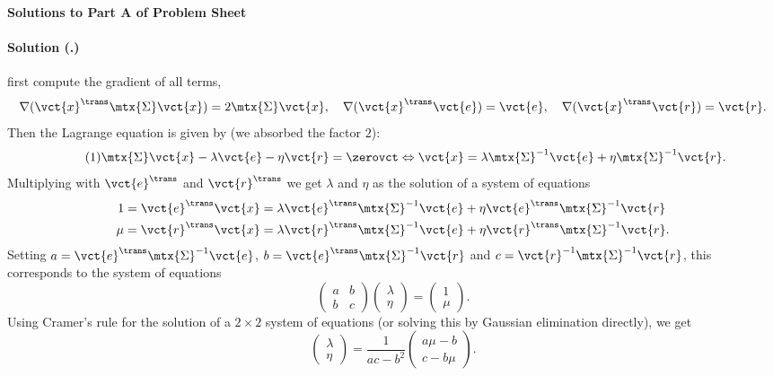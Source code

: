 \documentclass{article}
\newcounter{problemSheetNumber}
\newcounter{problems}
\renewcommand{\solution}[1]{\paragraph{Solution (\theproblemSheetNumber.\theproblems)}\addtocounter{problems}{1}\label{#1}}
\begin{document}
 
\begin{center}
{\Large {\bf Solutions to Part A of Problem Sheet \theproblemSheetNumber}}
\end{center}

\solution{pr:1} 
first compute the gradient of all terms,
\begin{equation*}
 \nabla (\vct{x}^{\trans}\mtx{\Sigma} \vct{x}) = 2\mtx{\Sigma} \vct{x}, \quad \nabla (\vct{x}^{\trans}\vct{e}) = \vct{e}, \quad \nabla (\vct{x}^{\trans}\vct{r})=\vct{r}.
\end{equation*}
Then the Lagrange equation is given by (we absorbed the factor $2$):
\begin{equation}\label{eq:1}\tag{1}
 \mtx{\Sigma} \vct{x}-\lambda \vct{e}-\eta \vct{r} = \zerovct \Leftrightarrow \vct{x} = \lambda \mtx{\Sigma}^{-1}\vct{e}+\eta\mtx{\Sigma}^{-1}\vct{r}.
\end{equation}
Multiplying with $\vct{e}^{\trans}$ and $\vct{r}^{\trans}$ we get $\lambda$ and $\eta$ as the solution of a system of equations
\begin{align*}
 1 = \vct{e}^{\trans}\vct{x} &= \lambda \vct{e}^{\trans}\mtx{\Sigma}^{-1}\vct{e}+ \eta \vct{e}^{\trans}\mtx{\Sigma}^{-1}\vct{r}\\
 \mu = \vct{r}^{\trans}\vct{x} &= \lambda \vct{r}^{\trans}\mtx{\Sigma}^{-1}\vct{e}+ \eta \vct{r}^{\trans}\mtx{\Sigma}^{-1}\vct{r}.
\end{align*}
Setting $a=\vct{e}^{\trans}\mtx{\Sigma}^{-1}\vct{e}$, $b=\vct{e}^{\trans}\mtx{\Sigma}^{-1}\vct{r}$ and $c=\vct{r}^{-1}\mtx{\Sigma}^{-1}\vct{r}$, this corresponds to the system of equations
\begin{equation*}
 \begin{pmatrix} a & b\\ b& c\end{pmatrix} \begin{pmatrix} \lambda \\ \eta\end{pmatrix} = \begin{pmatrix} 1\\ \mu\end{pmatrix}.
\end{equation*}
Using Cramer's rule for the solution of a $2\times 2$ system of equations (or solving this by Gaussian elimination directly), we get
\begin{equation*}
 \begin{pmatrix} \lambda\\ \eta\end{pmatrix} = \frac{1}{ac-b^2} \begin{pmatrix} a\mu-b\\c-b\mu \end{pmatrix}.
\end{equation*}
\end{document}

